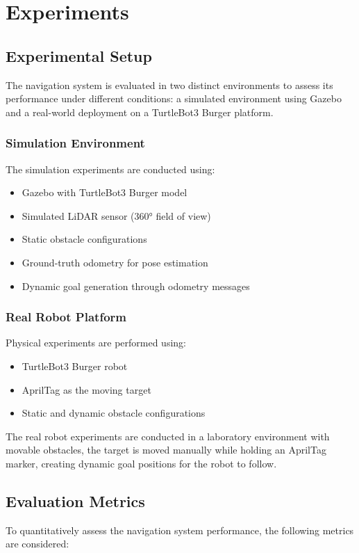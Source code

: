 \section{Experiments}
\label{sec:experiments}

\subsection{Experimental Setup}

The navigation system is evaluated in two distinct environments to assess its performance under different conditions: a simulated environment using Gazebo and a real-world deployment on a TurtleBot3 Burger platform.

\subsubsection{Simulation Environment}
The simulation experiments are conducted using:
\begin{itemize}
    \item Gazebo with TurtleBot3 Burger model
    \item Simulated LiDAR sensor (360° field of view)
    \item Static obstacle configurations
    \item Ground-truth odometry for pose estimation
    \item Dynamic goal generation through odometry messages
\end{itemize}


\subsubsection{Real Robot Platform}
Physical experiments are performed using:
\begin{itemize}
    \item TurtleBot3 Burger robot 
    \item AprilTag as the moving target
    \item Static and dynamic obstacle configurations
\end{itemize}

The real robot experiments are conducted in a laboratory environment with movable obstacles, the target is moved manually while holding an AprilTag marker, creating dynamic goal positions for the robot to follow.

\subsection{Evaluation Metrics}
\label{ssec:metrics}
To quantitatively assess the navigation system performance, the following metrics are considered: %

